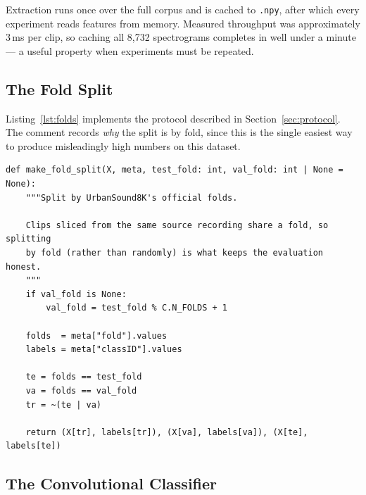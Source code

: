 \documentclass[11pt, a4paper]{article}
\begin{document}
Extraction runs once over the full corpus and is cached to \texttt{.npy}, after which every experiment reads features from memory. Measured throughput was approximately 3\,ms per clip, so caching all 8{,}732 spectrograms completes in well under a minute --- a useful property when experiments must be repeated.

\subsection{The Fold Split}

Listing~\ref{lst:folds} implements the protocol described in Section~\ref{sec:protocol}. The comment records \emph{why} the split is by fold, since this is the single easiest way to produce misleadingly high numbers on this dataset.

\begin{lstlisting}[caption={Official fold-based splitting (\texttt{src/data.py}).}, label={lst:folds}]
def make_fold_split(X, meta, test_fold: int, val_fold: int | None = None):
    """Split by UrbanSound8K's official folds.

    Clips sliced from the same source recording share a fold, so splitting
    by fold (rather than randomly) is what keeps the evaluation honest.
    """
    if val_fold is None:
        val_fold = test_fold % C.N_FOLDS + 1

    folds  = meta["fold"].values
    labels = meta["classID"].values

    te = folds == test_fold
    va = folds == val_fold
    tr = ~(te | va)

    return (X[tr], labels[tr]), (X[va], labels[va]), (X[te], labels[te])
\end{lstlisting}

\subsection{The Convolutional Classifier}
\end{document}

